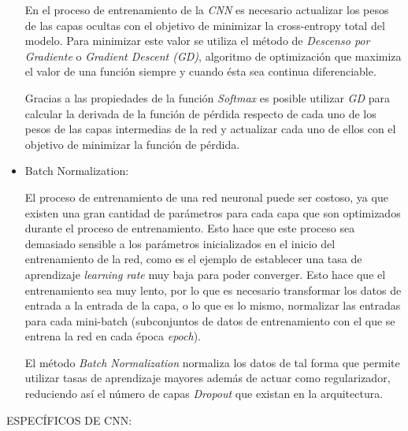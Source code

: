 \begin{itemize}
                    En el proceso de entrenamiento de la \textit{CNN} es necesario actualizar los pesos de las capas ocultas con el objetivo de minimizar la cross-entropy total del modelo. Para minimizar este valor se utiliza el método de \textit{Descenso por Gradiente} o \textit{Gradient Descent (GD)}, algoritmo de optimización que maximiza el valor de una función siempre y cuando ésta sea continua diferenciable.

                    Gracias a las propiedades de la función \textit{Softmax} es posible utilizar \textit{GD} para calcular la derivada de la función de pérdida respecto de cada uno de los pesos de las capas intermedias de la red y actualizar cada uno de ellos con el objetivo de minimizar la función de pérdida.

                \item Batch Normalization:

                    El proceso de entrenamiento de una red neuronal puede ser costoso, ya que existen una gran cantidad de parámetros para cada capa que son optimizados durante el proceso de entrenamiento. Esto hace que este proceso sea demasiado sensible a los parámetros inicializados en el inicio del entrenamiento de la red, como es el ejemplo de establecer una tasa de aprendizaje \textit{learning rate} muy baja para poder converger. Esto hace que el entrenamiento sea muy lento, por lo que es necesario transformar los datos de entrada a la entrada de la capa, o lo que es lo mismo, normalizar las entradas para cada mini-batch (subconjuntos de datos de entrenamiento con el que se entrena la red en cada época \textit{epoch}).


                    El método \textit{Batch Normalization} \cite{BatchNormalization} normaliza los datos de tal forma que permite utilizar tasas de aprendizaje mayores además de actuar como regularizador, reduciendo así el número de capas \textit{Dropout} que existan en la arquitectura.

            \end{itemize}


            ESPECÍFICOS DE CNN:

